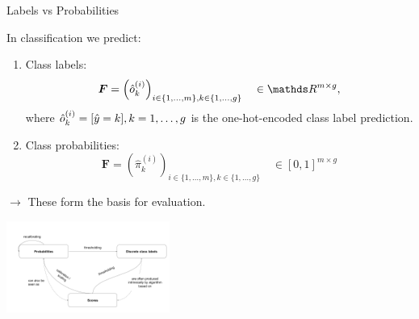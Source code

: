\begin{vbframe}{Labels vs Probabilities}

\footnotesize

In classification we predict:

\begin{enumerate}
  \item Class labels: \\
  $$\bm{F} = \left( \hat{o}_k^{(i)} \right)_{i \in \{1, \dots, m\}, 
  k \in \{1, \dots, g\}}
  \quad \in \R^{m \times g},$$
  where $\hat{o}_k^{(i)} = [\hat{y} = k], k = 1, \dots, g$ is the one-hot-encoded 
  class label prediction.
  \item Class probabilities: \\
  $$\bm{F} = \left(\hat{\pi}_k^{(i)} \right)_{i \in \{1, \dots, m\}, 
  k \in \{1, \dots, g\}}
  \quad \in [0, 1]^{m \times g}$$
\end{enumerate}

\vfill

$\rightarrow$ These form the basis for evaluation.

\vfill

  \includegraphics[width = 0.4\textwidth]{figure_man/classif_thresholding.png}


\end{vbframe}

